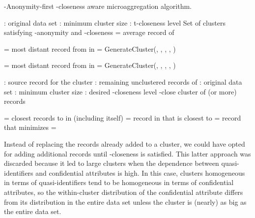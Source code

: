 \documentclass[10pt,journal,compsoc]{IEEEtran}
\theoremstyle{definition}
\theoremstyle{plain}
\begin{document}
\begin{algorithm}
	\protect\caption{\label{alg:k-anonymity-first}-Anonymity-first -closeness aware microaggregation algorithm.}
	
	\begin{algorithmic}[0]
			 : original data set
			\State \hspace{1.11cm}: minimum cluster size
			\State \hspace{1.11cm}: t-closeness level
			 Set of clusters satisfying -anonymity and -closeness
			\vspace{0.3cm}
			\State 
			\State 
			\While{}
				\State = average record of 
				
				\State = most distant record from  in 
				\State = GenerateCluster(, , , , )
				\State
				\State
				
				\If{}
					\State = most distant record from  in 
					\State = GenerateCluster(, , , , )
					\State
					\State
				\EndIf
			\EndWhile
		\EndFunction
		
			 : source record for the cluster
			\State \hspace{1.11cm}	: remaining unclustered records of 
			\State \hspace{1.11cm}	: original data set
			\State \hspace{1.11cm}	: minimum cluster size
			\State \hspace{1.11cm}	: desired -closeness level
			 -close cluster of  (or more) records
			
			\If{}
				\State 
			\Else
				\State  =  closest records to  in  (including  itself)
				\State 
					\State  = record in  that is closest to 
					\State  = record  that minimizes 
					\If{}
						\State =
					\EndIf
					\State 
				\EndWhile
			\EndIf
		\EndFunction
		
	\end{algorithmic}
	
	
\end{algorithm}

Instead of replacing the records already added to a cluster, we could have opted for
adding additional records until -closeness is satisfied. This latter approach was 
discarded because it led to large clusters when the dependence between 
quasi-identifiers
and confidential attributes is high.
In this case,
clusters homogeneous in terms of quasi-identifiers tend
to be homogeneous in terms of confidential attributes, 
so the within-cluster distribution of the confidential attribute
differs from its distribution in the entire data set unless
the cluster is (nearly) as big as the entire data set. 
\end{document}
